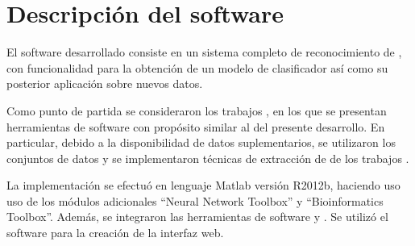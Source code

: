 %
%
%
%
\chapter{Descripción del software}
%
El software desarrollado consiste en un sistema completo de
reconocimiento de , con funcionalidad para la obtención de
un modelo de clasificador así como su posterior aplicación sobre
nuevos datos.

Como punto de partida se consideraron los trabajos
\cite{xue,ng,batuwita,sheng,sewer,ding}, en los que se presentan
herramientas de software con propósito similar al del presente
desarrollo.
En particular, debido a la disponibilidad de datos suplementarios,
se utilizaron los conjuntos de datos y se implementaron técnicas de
extracción de  de los trabajos \cite{xue,ng,batuwita}.

La implementación se efectuó en lenguaje Matlab versión R2012b,
haciendo uso uso de los módulos adicionales ``Neural Network Toolbox''
y ``Bioinformatics Toolbox''.
Además, se integraron las herramientas de software 
\cite{libsvm} y  \cite{vienna}.
Se utilizó el software \work\webdemo{} \cite{webdemobuilder} para
la creación de la interfaz web.
